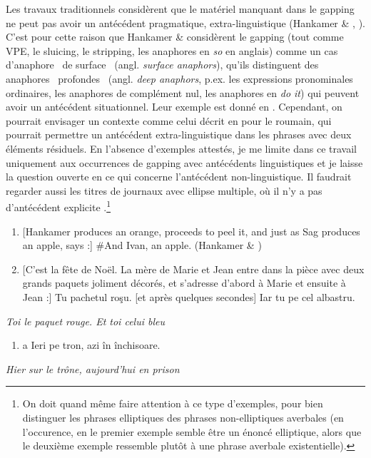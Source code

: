 Les travaux traditionnels considèrent que le matériel manquant dans le gapping ne peut pas avoir un antécédent pragmatique, extra-linguistique (Hankamer \& \citet{Sag1976}, \citet{Chao1988}). C'est pour cette raison que Hankamer \& \citet{Sag1976} considèrent le gapping (tout comme VPE, le sluicing, le stripping, les anaphores en \textit{so} en anglais) comme un cas d'anaphore {\guillemotleft}~de surface~{\guillemotright} (angl. \textit{surface anaphors}), qu'ils distinguent des anaphores {\guillemotleft}~profondes~{\guillemotright} (angl. \textit{deep anaphors}, p.ex. les expressions pronominales ordinaires, les anaphores de complément nul, les anaphores en \textit{do it}) qui peuvent avoir un antécédent situationnel. Leur exemple est donné en . Cependant, on pourrait envisager un contexte comme celui décrit en  pour le roumain, qui pourrait permettre un antécédent extra-linguistique dans les phrases avec deux éléments résiduels. En l'absence d'exemples attestés, je me limite dans ce travail uniquement aux occurrences de gapping avec antécédents linguistiques et je laisse la question ouverte en ce qui concerne l'antécédent non-linguistique. Il faudrait regarder aussi les titres de journaux avec ellipse multiple, où il n'y a pas d'antécédent explicite .\footnote{On doit quand même faire attention à ce type d'exemples, pour bien distinguer les phrases elliptiques des phrases non-elliptiques averbales (en l'occurence, en  le premier exemple semble être un énoncé elliptique, alors que le deuxième exemple ressemble plutôt à une phrase averbale existentielle).}


\begin{enumerate}
\item \label{bkm:Ref289116304}[Hankamer produces an orange, proceeds to peel it, and just as Sag produces an apple, says :] \#And Ivan, an apple.          (Hankamer \& \citet{Sag1976})

\item \label{bkm:Ref289116322}[C'est la fête de Noël. La mère de Marie et Jean entre dans la pièce avec deux grands paquets joliment décorés, et s'adresse d'abord à Marie et ensuite à Jean :] Tu pachetul roşu. [et après quelques secondes] Iar tu pe cel albastru.


\end{enumerate}
\textit{Toi le paquet rouge. Et toi celui bleu}           


\begin{enumerate}
\item \label{bkm:Ref299473004}a  Ieri pe tron, azi în închisoare.


\end{enumerate}
{\itshape
Hier sur le trône, aujourd'hui en prison  } 

